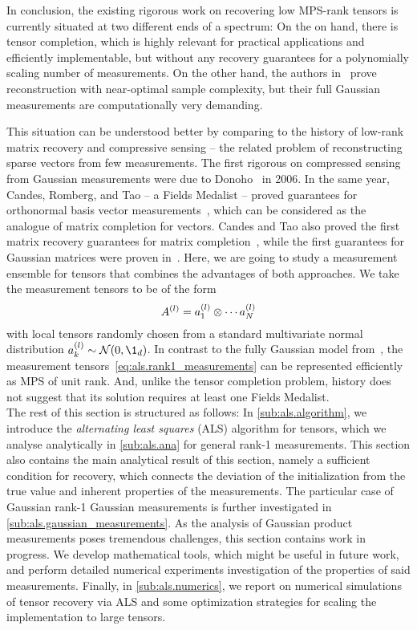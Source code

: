 In conclusion, the existing rigorous work on recovering low MPS-rank tensors is currently situated at two different ends of a spectrum:
On the on hand, there is tensor completion, which is highly relevant for practical applications and efficiently implementable, but without any recovery guarantees for a polynomially scaling number of measurements.
On the other hand, the authors in~\cite{Rauhut_2014_Tensor} prove reconstruction with near-optimal sample complexity, but their full Gaussian measurements are computationally very demanding.

This situation can be understood better by comparing to the history of low-rank matrix recovery and compressive sensing -- the related problem of reconstructing sparse vectors from few measurements.
The first rigorous on compressed sensing from Gaussian measurements were due to Donoho~\cite{Donoho_2006_For} in 2006.
In the same year, Candes, Romberg, and Tao -- a Fields Medalist -- proved guarantees for orthonormal basis vector measurements~\cite{Candes_2006_Stable}, which can be considered as the analogue of matrix completion for vectors.
Candes and Tao also proved the first matrix recovery guarantees for matrix completion~\cite{Candes_2010_Power}, while the first guarantees for Gaussian matrices were proven in~\cite{Recht_2010_Guaranteed}.
Here, we are going to study a measurement ensemble for tensors that combines the advantages of both approaches.
We take the measurement tensors to be of the form
\[
  A^{(l)} = a^{(l)}_1 \otimes \cdots a^{(l)}_N
  \label{eq:als.rank1_measurements}
\]
with local tensors randomly chosen from a standard multivariate normal distribution $a\ind{l}_k \sim \Normal(0, \1_d)$.
In contrast to the fully Gaussian model from~\cite{Rauhut_2014_Tensor,Rauhut_2016_Low}, the measurement tensors~\eqref{eq:als.rank1_measurements} can be represented efficiently as MPS of unit rank.
And, unlike the tensor completion problem, history does not suggest that its solution requires at least one Fields Medalist.\\



The rest of this section is structured as follows:
In \cref{sub:als.algorithm}, we introduce the \emph{alternating least squares} (ALS) algorithm for tensors, which we analyse analytically in \cref{sub:als.ana} for general rank-1 measurements.
This section also contains the main analytical result of this section, namely a sufficient condition for recovery, which connects the deviation of the initialization from the true value and inherent properties of the measurements.
The particular case of Gaussian rank-1 Gaussian measurements is further investigated in \cref{sub:als.gaussian_measurements}.
As the analysis of Gaussian product measurements poses tremendous challenges, this section contains work in progress.
We develop mathematical tools, which might be useful in future work, and perform detailed numerical experiments investigation of the properties of said measurements.
Finally, in \cref{sub:als.numerics}, we report on numerical simulations of tensor recovery via ALS and some optimization strategies for scaling the implementation to large tensors.



